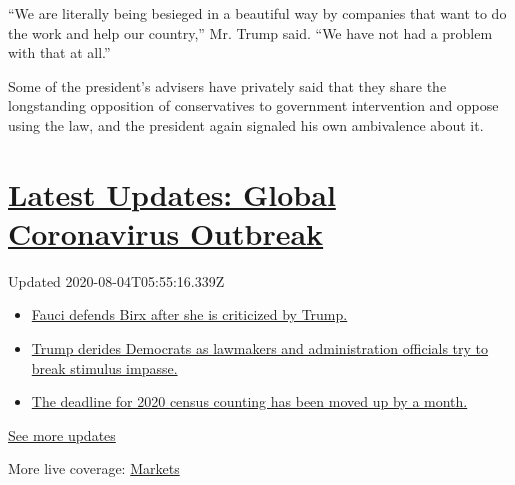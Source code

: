 ``We are literally being besieged in a beautiful way by companies that
want to do the work and help our country,'' Mr. Trump said. ``We have
not had a problem with that at all.''

Some of the president's advisers have privately said that they share the
longstanding opposition of conservatives to government intervention and
oppose using the law, and the president again signaled his own
ambivalence about it.

\hypertarget{latest-updates-global-coronavirus-outbreak}{%
\section{\texorpdfstring{\href{https://www.nytimes.com/2020/08/03/world/coronavirus-covid-19.html?action=click\&pgtype=Article\&state=default\&region=MAIN_CONTENT_1\&context=storylines_live_updates}{Latest
Updates: Global Coronavirus
Outbreak}}{Latest Updates: Global Coronavirus Outbreak}}\label{latest-updates-global-coronavirus-outbreak}}

Updated 2020-08-04T05:55:16.339Z

\begin{itemize}
\tightlist
\item
  \href{https://www.nytimes.com/2020/08/03/world/coronavirus-covid-19.html?action=click\&pgtype=Article\&state=default\&region=MAIN_CONTENT_1\&context=storylines_live_updates\#link-4547638f}{Fauci
  defends Birx after she is criticized by Trump.}
\item
  \href{https://www.nytimes.com/2020/08/03/world/coronavirus-covid-19.html?action=click\&pgtype=Article\&state=default\&region=MAIN_CONTENT_1\&context=storylines_live_updates\#link-15e7f995}{Trump
  derides Democrats as lawmakers and administration officials try to
  break stimulus impasse.}
\item
  \href{https://www.nytimes.com/2020/08/03/world/coronavirus-covid-19.html?action=click\&pgtype=Article\&state=default\&region=MAIN_CONTENT_1\&context=storylines_live_updates\#link-e5a2cda}{The
  deadline for 2020 census counting has been moved up by a month.}
\end{itemize}

\href{https://www.nytimes.com/2020/08/03/world/coronavirus-covid-19.html?action=click\&pgtype=Article\&state=default\&region=MAIN_CONTENT_1\&context=storylines_live_updates}{See
more updates}

More live coverage:
\href{https://www.nytimes.com/live/2020/08/03/business/stock-market-today-coronavirus?action=click\&pgtype=Article\&state=default\&region=MAIN_CONTENT_1\&context=storylines_live_updates}{Markets}

